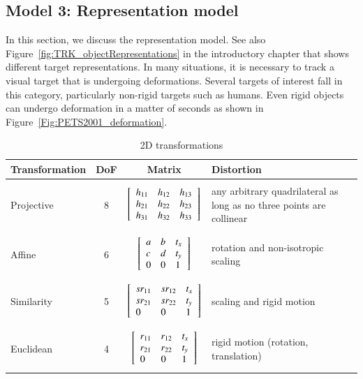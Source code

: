 \begin{Body}
\section{Model 3: Representation model}
\label{Sec:Representation_model}
In this section, we discuss the representation model.  See also Figure~\ref{fig:TRK_objectRepresentations} in the introductory chapter that shows different target representations.  In many situations, it is necessary to track a visual target that is undergoing deformations.  Several targets of interest fall in this category, particularly non-rigid targets such as humans.  Even rigid objects can undergo deformation in a matter of seconds as shown in Figure~\ref{Fig:PETS2001_deformation}.  

								\begin{table}[t]
								\centering
								\begin{tabular}{| l | c | c | p{2.5in} |}
								\hline
								Transformation & DoF & Matrix & Distortion\\ \hline 
								& & & \\ Projective & 8 & $\left[ \begin{array}{lll} h_{11} & h_{12} & h_{13} \\ h_{21} & h_{22} & h_{23} \\ h_{31} & h_{32} & h_{33} \\ \end{array} \right]$ & any arbitrary quadrilateral as long as no three points are collinear\\  & & & \\ \hline
								& & & \\ Affine & 6 & $\left[ \begin{array}{lll} a &b & t_x \\ c & d & t_y \\ 0 & 0 & 1 \\ \end{array} \right]$ & rotation and non-isotropic scaling\\  & & & \\ \hline
								& & & \\ Similarity & 5 & $\left[ \begin{array}{lll} sr_{11} & sr_{12} & t_x \\ sr_{21} & sr_{22} & t_y \\ 0 & 0 & 1 \\ \end{array} \right]$ & scaling and rigid motion\\  & & & \\ \hline
								& & & \\ Euclidean & 4 & $\left[ \begin{array}{lll} r_{11} & r_{12} & t_x \\ r_{21} & r_{22} & t_y \\ 0 & 0 & 1 \\ \end{array} \right]$ & rigid motion (rotation, translation) \\  & & & \\ \hline
								\end{tabular}\
								\caption{2D transformations}
								\label{table:2Dtransformations}
								\end{table}


\end{Body}

